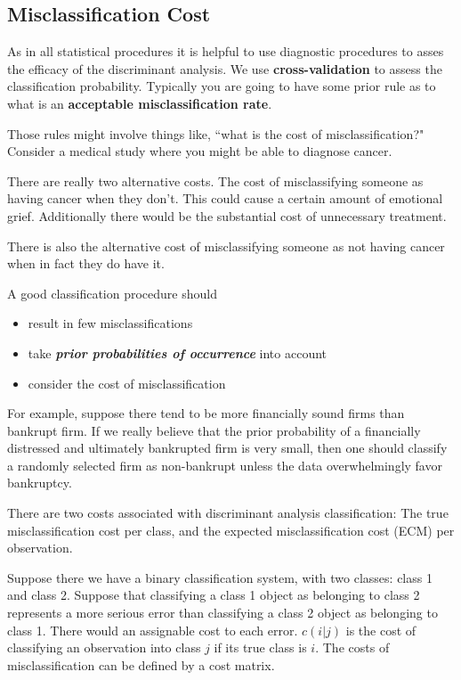 
\subsection{Misclassification Cost}

As in all statistical procedures it is helpful to use diagnostic procedures to asses the efficacy of the discriminant analysis. We use \textbf{cross-validation} to assess the classification probability.
Typically you are going to have some prior rule as to what is an \textbf{acceptable misclassification rate}.

Those rules might involve things like, ``what is the cost of misclassification?" Consider a medical study where you might be able to diagnose cancer.

There are really two alternative costs. The cost of misclassifying someone as having cancer when they don't.
This could cause a certain amount of emotional grief. Additionally there would be the substantial cost of unnecessary treatment.

There is also the alternative cost of misclassifying someone as not having cancer when in fact they do have it.

A good classification procedure should
 \begin{itemize}
 \item result in few misclassifications
 \item take \textbf{\textit{prior probabilities of occurrence}} into account
 \item consider the cost of misclassification
 \end{itemize}
 
For example, suppose there tend to be more financially sound firms than bankrupt
firm. If we really believe that the prior probability of a financially
distressed and ultimately bankrupted firm is very small, then one should
classify a randomly selected firm as non-bankrupt unless the data
overwhelmingly favor bankruptcy.



There are two costs associated with discriminant analysis classification: The true misclassification cost per class, and the expected misclassification cost (ECM) per observation.

Suppose there we have a binary classification system, with two classes: class 1 and class 2.
Suppose that classifying a class 1 object as belonging to class 2 represents a more serious error than classifying a class 2 object as belonging to class 1. There would an assignable cost to each error.
$c(i|j)$ is the cost of classifying an observation into class $j$ if its true class is $i$.
The costs of misclassification can be defined by a cost matrix.

